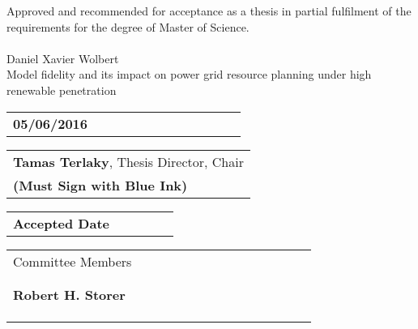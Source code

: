 
\thispagestyle{plain}

Approved and recommended for acceptance as a thesis in partial fulfilment of the requirements for the degree of Master of Science.
\\
\\
Daniel Xavier Wolbert \\
Model fidelity and its impact on power grid resource planning under high renewable penetration

\vspace{.1in}

\begin{tabular}{l}
\\
\hline
\textbf{05/06/2016 \ \ \ \ \ \ \ \ \ \ \ \ \ \ \ \ \ \ \ }
\end{tabular}

\begin{flushright}
\begin{tabular}{l}
\\
\hline
\textbf{Tamas Terlaky}, Thesis Director, Chair \\ 
\textbf{(Must Sign with Blue Ink)}
\end{tabular}

\vspace{.05in}

\end{flushright}

\begin{tabular}{l}
\\
\hline
\textbf{Accepted Date \ \ \ \ \ \ \ }
\end{tabular}


\begin{flushright}
\begin{tabular}{l}
Committee Members \ \ \ \ \ \ \ \ \ \ \ \ \ \ \ \ \ \ \ \ \ \ \ \ \ \
\\ 
\\
\\
\hline
\textbf{Robert H. Storer}\\
\\ 
\\
\\

\end{tabular}
\end{flushright}
\newpage